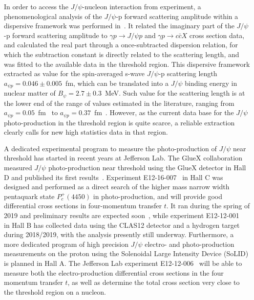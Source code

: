 \documentclass[prd,amsmath,twocolumn,floatfix,amssymb, preprintnumbers, linenumbers,nofootinbib, superscriptaddress]{revtex4}
\begin{document}
In order to access the $J/\psi$-nucleon interaction from experiment, a phenomenological analysis of the $J/\psi$-p forward scattering amplitude within a dispersive framework was performed in~\cite{Gryniuk:2016mpk}. It related the imaginary part of the $J/\psi$-p forward scattering amplitude 
to $\gamma p \to J/\psi p$ and $\gamma p \to c \bar c X$ cross section data, and calculated the real part through a once-subtracted dispersion relation, for which the subtraction constant is directly related to the scattering length, and was fitted to the available data in the threshold region.   
This dispersive framework extracted as value for the spin-averaged s-wave $J/\psi$-p scattering length $a_{\psi p} = 0.046 \pm 0.005$~fm, which can be translated into a 
$J/\psi$ binding energy in nuclear matter 
of $B_{\psi} = 2.7 \pm 0.3$~MeV. Such value for the scattering length is at the lower end of the range of values estimated in the literature, ranging from 
$a_{\psi p} = 0.05$~fm~\cite{Kaidalov:1992hd} to 
$a_{\psi p} = 0.37$~fm~\cite{Sibirtsev:2005ex}. However, as the current data base for the $J/\psi$ photo-production in the threshold region is quite scarce, a reliable extraction clearly calls for new high statistics data in that region.  

A dedicated experimental program to measure the  photo-production of $J/\psi$ near threshold  has started in recent years at Jefferson Lab. The GlueX collaboration measured $J/\psi$ photo-production near threshold using the GlueX detector in Hall D and published its first  results~\cite{Ali:2019lzf}. Experiment E12-16-007~\cite{Meziani:2016lhg} in Hall C was designed and performed as a direct search of the higher mass narrow width pentaquark state $P_c^+(4450)$ in photo-production, and will provide good differential cross sections in four-momentum transfer $t$. It ran during the spring of 2019 and preliminary results are expected soon~\cite{Joosten:2020}, while experiment E12-12-001~\cite{CLAS12-tcs:proposal} in Hall B has collected data using the CLAS12 detector and a hydrogen target during  2018/2019, with the analysis presently still underway. Furthermore, a more dedicated program of high precision $J/\psi$ electro- and photo-production  measurements on the proton  using the Solenoidal Large Intensity Device (SoLID) is planned in Hall A. The Jefferson Lab experiment E12-12-006~\cite{SoLIDjpsi:proposal} will be able to measure both the electro-production differential cross sections in the four momentum transfer $t$, as well as determine the total cross section very close to the threshold region on a nucleon.  
\end{document}
